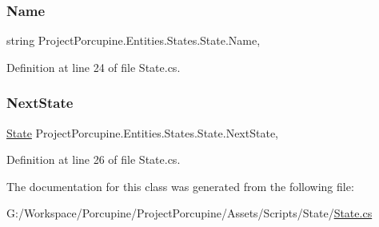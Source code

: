 \subsubsection{\texorpdfstring{Name}{Name}}
{\footnotesize\ttfamily string Project\+Porcupine.\+Entities.\+States.\+State.\+Name\hspace{0.3cm}{\ttfamily [get]}, {}}



Definition at line 24 of file State.\+cs.

\mbox{\label{class_project_porcupine_1_1_entities_1_1_states_1_1_state_ac86f35a38df13f9c426ea32265b8455a}} 
\subsubsection{\texorpdfstring{Next\+State}{NextState}}
{\footnotesize\ttfamily \hyperlink{class_project_porcupine_1_1_entities_1_1_states_1_1_state}{State} Project\+Porcupine.\+Entities.\+States.\+State.\+Next\+State\hspace{0.3cm}{\ttfamily [get]}, {}}



Definition at line 26 of file State.\+cs.



The documentation for this class was generated from the following file\+:\begin{DoxyCompactItemize}
\item 
G\+:/\+Workspace/\+Porcupine/\+Project\+Porcupine/\+Assets/\+Scripts/\+State/\hyperlink{_state_8cs}{State.\+cs}\end{DoxyCompactItemize}
